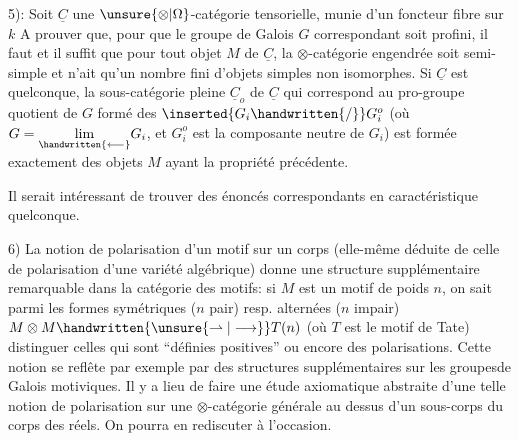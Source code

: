 
5): Soit $\underline{C}$ une $\unsure{\otimes|\Omega}$-catégorie tensorielle,  munie d'un foncteur fibre sur $k$  A prouver que, pour que le groupe de Galois $G$ correspondant soit profini, il faut et il suffit que pour tout objet $M$ de $\underline{C}$, la $\otimes$-catégorie engendrée soit semi-simple et n'ait qu'un nombre fini d'objets simples non isomorphes. Si $\underline{C}$ est quelconque, la sous-catégorie pleine  $\underline{C}_o$ de $\underline{C}$ qui correspond au pro-groupe quotient de $G$ formé des $\inserted{G_i\handwritten{/}}G_i^o$ (où $G=\underset{\handwritten{\longleftarrow}}{\lim}G_i$, et $G_i^o$ est la composante neutre de $G_i$) est formée exactement des objets $M$ ayant la propriété précédente.

Il serait intéressant de trouver des énoncés correspondants en caractéristique quelconque.

6) La notion de polarisation d'un motif sur un corps (elle-même déduite de celle de polarisation d'une variété algébrique) donne une structure supplémentaire remarquable dans la catégorie des motifs: si $M$ est un motif de poids $n$, on sait parmi les formes symétriques ($n$ pair) resp. alternées ($n$ impair) $M\otimes M\handwritten{\unsure{\rightharpoonup|\longrightarrow}} T(n)$ (où $T$ est le motif de Tate) distinguer celles qui sont ``définies positives'' ou encore des polarisations. Cette notion se reflête par exemple par des structures supplémentaires sur les groupesde Galois motiviques. Il y a lieu de faire une étude axiomatique abstraite d'une telle notion de polarisation sur une $\otimes$-catégorie générale au dessus d'un  sous-corps du corps des réels. On pourra en rediscuter à l'occasion.
